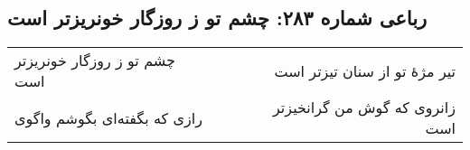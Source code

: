 \begin{center}
\section*{رباعی شماره ۲۸۳: چشم تو ز روزگار خونریزتر است}
\label{sec:0283}
\begin{longtable}{l p{0.5cm} r}
چشم تو ز روزگار خونریزتر است
&&
تیر مژهٔ تو از سنان تیزتر است
\\
رازی که بگفته‌ای بگوشم واگوی
&&
زانروی که گوش من گرانخیزتر است
\\
\end{longtable}
\end{center}
